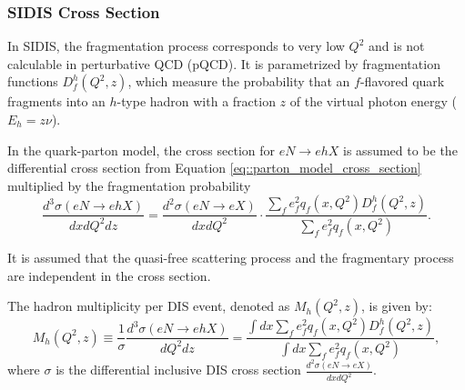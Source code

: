 \subsubsection{SIDIS Cross Section}
\label{sssec::sidis_cross_section}
    In SIDIS, the fragmentation process corresponds to very low $Q^2$ and is not calculable in perturbative QCD (pQCD).
    It is parametrized by fragmentation functions $D_f^h(Q^2, z)$, which measure the probability that an $f$-flavored quark fragments into an $h$-type hadron with a fraction $z$ of the virtual photon energy ($E_h = z\nu$).

    In the quark-parton model, the cross section for $eN \rightarrow ehX$ is assumed to be the differential cross section from Equation \eqref{eq::parton_model_cross_section} multiplied by the fragmentation probability
    \begin{equation}
        \label{eq::fragmentation_probability}
        \frac{d^3\sigma(eN \rightarrow ehX)}{dxdQ^2dz} =
            \frac{d^2\sigma(eN \rightarrow eX)}{dxdQ^2} \cdot
            \frac{\sum_f e^2_f q_f(x,Q^2) D^h_f(Q^2,z)}{\sum_f e^2_f q_f(x,Q^2)}.
    \end{equation}

    It is assumed that the quasi-free scattering process and the fragmentary process are independent in the cross section.

    The hadron multiplicity per DIS event, denoted as $M_h(Q^2, z)$, is given by:
    \begin{equation*}
        M_h(Q^2,z) \equiv \frac{1}{\sigma} \frac{d^3\sigma(eN \rightarrow ehX)}{dQ^2dz} = \frac{\int dx \sum_f e^2_f q_f(x,Q^2) D^h_f(Q^2,z)}{\int dx \sum_f e^2_f q_f(x,Q^2)},
    \end{equation*}
    where $\sigma$ is the differential inclusive DIS cross section $\frac{d^2\sigma(eN \rightarrow eX)}{dxdQ^2}$.
